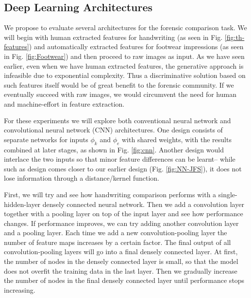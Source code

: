 \documentclass[11pt, doublespacing]{article}
\begin{document}
\subsection {Deep Learning Architectures}

We propose to evaluate several architectures for the forensic comparison task. We will begin with human extracted features for handwriting (as seen in Fig. \ref{fig:th-features}) and automatically extracted features for footwear impressions (as seen in Fig. \ref{fig:Footwear}) and then proceed to  raw images as input. As we have seen earlier,  even when we have human extracted features,  the generative approach is infeasible due to  exponential complexity.  Thus a discriminative solution based on such features itself would be of great benefit to the forensic community. If we eventually succeed with raw images, we would circumvent the need for human and machine-effort in feature extraction.

For these experiments we will explore both conventional neural network and   convolutional  neural network (CNN) architectures.  One design  consists of separate networks for inputs $\phi_{k}$  and $\phi_{e}$ with shared weights, with the results combined at later stages, as shown  in Fig. \ref{fig:cnn}.  Another design would interlace the two inputs so that minor feature differences can be learnt-- while such as design comes closer to our earlier design (Fig. \ref{fig:NN-JFS}),  it does not lose information through a distance/kernel function.

First, we will try and see how handwriting comparison performs
with  a single-hidden-layer densely connected neural
network. Then we add a convolution layer together with a pooling
layer on top of the input layer and see how  performance changes.
If  performance improves, we can try adding another convolution
layer and a pooling layer. Each time we add a new convolution-pooling
layer the number of feature maps increases by a certain factor. The
final output of all convolution-pooling layers will go into a final
densely connected layer. At first, the number of nodes in the densely
connected layer is small, so that the model does not overfit the training
data in the last layer. Then we gradually increase the number of nodes
in the final densely connected layer until  performance stops increasing.
\end{document}
